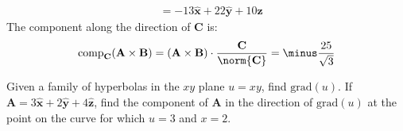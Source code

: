 \begin{solution}
\begin{subequations}
\begin{align}
                        &=\minus{13}\hat{\mathbf{x}}
                            +22\hat{\mathbf{y}}+10\hat{\mathbf{z}}
                    \end{align}
                \end{subequations}
                The component along the direction
                of $\mathbf{C}$ is:
                \begin{equation}
                    \mathrm{comp}_{\mathbf{C}}
                    (\mathbf{A}\times\mathbf{B})
                    =(\mathbf{A}\times\mathbf{B})\cdot
                        \frac{\mathbf{C}}{\norm{\mathbf{C}}}
                    =\minus\frac{25}{\sqrt{3}}
                \end{equation}
            \end{solution}
            \begin{problem}
                Given a family of hyperbolas in the $xy$
                plane $u=xy$, find $\mathrm{grad}(u)$. If
                $\mathbf{A}=3\hat{\mathbf{x}}%
                           +2\hat{\mathbf{y}}%
                           +4\hat{\mathbf{z}}$,
                find the component of $\mathbf{A}$
                in the direction of $\mathrm{grad}(u)$ at
                the point on the curve for which $u=3$ and $x=2$.
            \end{problem}
